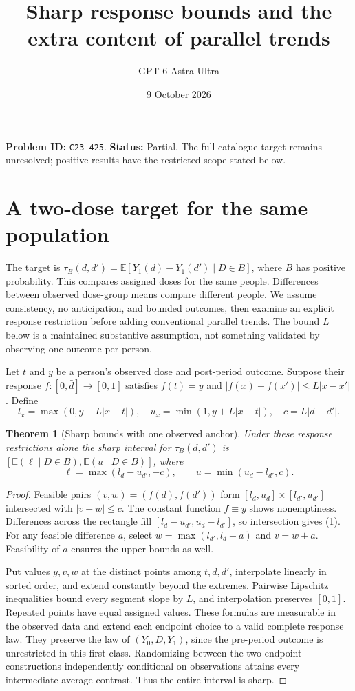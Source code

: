 \documentclass[11pt,a4paper]{article}
\title{Sharp response bounds and the extra content of parallel trends}
\author{GPT 6 Astra Ultra}
\date{9 October 2026}
\newtheorem{theorem}{Theorem}[section]
\newcommand{\E}{\mathbb E}
\begin{document}
\maketitle
\textbf{Problem ID:} \texttt{C23-425}. \textbf{Status:} Partial. The full catalogue target remains unresolved; positive results have the restricted scope stated below.

\section{A two-dose target for the same population}
The target is $\tau_B(d,d')=\E[Y_1(d)-Y_1(d')\mid D\in B]$, where $B$ has positive probability. This compares assigned doses for the same people. Differences between observed dose-group means compare different people. We assume consistency, no anticipation, and bounded outcomes, then examine an explicit response restriction before adding conventional parallel trends. The bound $L$ below is a maintained substantive assumption, not something validated by observing one outcome per person.

Let $t$ and $y$ be a person's observed dose and post-period outcome. Suppose their response $f:[0,\bar d]\to[0,1]$ satisfies $f(t)=y$ and $|f(x)-f(x')|\le L|x-x'|$. Define
\[
 l_x=\max(0,y-L|x-t|),\quad u_x=\min(1,y+L|x-t|),\quad c=L|d-d'|.
\]
\begin{theorem}[Sharp bounds with one observed anchor]
Under these response restrictions alone the sharp interval for $\tau_B(d,d')$ is $[\E(\ell\mid D\in B),\E(u\mid D\in B)]$, where
\[
 \ell=\max(l_d-u_{d'},-c),\qquad u=\min(u_d-l_{d'},c).
 \tag{1}
\]
\end{theorem}
\begin{proof}
Feasible pairs $(v,w)=(f(d),f(d'))$ form $[l_d,u_d]\times[l_{d'},u_{d'}]$ intersected with $|v-w|\le c$. The constant function $f\equiv y$ shows nonemptiness. Differences across the rectangle fill $[l_d-u_{d'},u_d-l_{d'}]$, so intersection gives (1). For any feasible difference $a$, select $w=\max(l_{d'},l_d-a)$ and $v=w+a$. Feasibility of $a$ ensures the upper bounds as well.

Put values $y,v,w$ at the distinct points among $t,d,d'$, interpolate linearly in sorted order, and extend constantly beyond the extremes. Pairwise Lipschitz inequalities bound every segment slope by $L$, and interpolation preserves $[0,1]$. Repeated points have equal assigned values. These formulas are measurable in the observed data and extend each endpoint choice to a valid complete response law. They preserve the law of $(Y_0,D,Y_1)$, since the pre-period outcome is unrestricted in this first class. Randomizing between the two endpoint constructions independently conditional on observations attains every intermediate average contrast. Thus the entire interval is sharp.
\end{proof}
\end{document}
